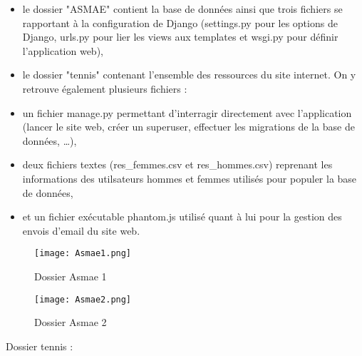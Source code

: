 \begin{itemize}
	\item le dossier "ASMAE" contient  la base de données ainsi que trois fichiers se rapportant à la configuration de Django (settings.py pour les options de Django, urls.py pour lier les views aux templates et wsgi.py pour définir l'application web),
	\item le dossier "tennis" contenant l'ensemble des ressources du site internet. On y retrouve également plusieurs fichiers :
	\item un fichier manage.py permettant d'interragir directement avec l'application (lancer le site web, créer un superuser, effectuer les migrations de la base de données, …),
	\item deux fichiers textes (res\_femmes.csv et res\_hommes.csv) reprenant les informations des utilsateurs hommes et femmes utilisés pour populer la base de données,
	\item et un fichier exécutable phantom.js utilisé quant à lui pour la gestion des envois d'email du site web.
\end{itemize}

\begin{figure}[H]
\centering
\texttt{[image: Asmae1.png]}
\caption{Dossier Asmae 1}
\end{figure}
\vspace{-5cm}
\begin{figure}[H]
\centering
\texttt{[image: Asmae2.png]}
\caption{Dossier Asmae 2}
\end{figure}

Dossier tennis :\\

